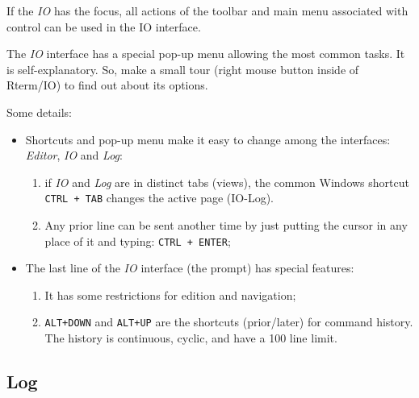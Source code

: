 If the \textit{IO} has the focus, all actions of the \RR{} toolbar and main menu
associated with control \RR{} can be used in the IO interface.

The \textit{IO} interface has a special pop-up menu allowing the most common
tasks. It is self-explanatory. So, make a small tour (right mouse button inside
of Rterm/IO) to find out about its options.

Some details:

\begin{itemize}
  \item Shortcuts and pop-up menu make it easy to change among the interfaces:
    \textit{Editor}, \textit{IO} and \textit{Log}:
    \begin{enumerate}
      \item if \textit{IO} and \textit{Log} are in distinct tabs (views), the
        common Windows shortcut \texttt{CTRL + TAB} changes the active page (IO-Log).
      \item Any prior line can be sent another time by just putting the cursor
        in any place of it and typing: \texttt{CTRL + ENTER};
    \end{enumerate}
  \item The last line of the \textit{IO} interface (the prompt) has special features:
    \begin{enumerate}
      \item It has some restrictions for edition and navigation;
      \item \texttt{ALT+DOWN} and \texttt{ALT+UP} are the shortcuts (prior/later)
        for command history. The history is continuous, cyclic, and have a 100
        line limit.
    \end{enumerate}
\end{itemize}


\hypertarget{working_rterm_log}{}
\subsection{Log}

